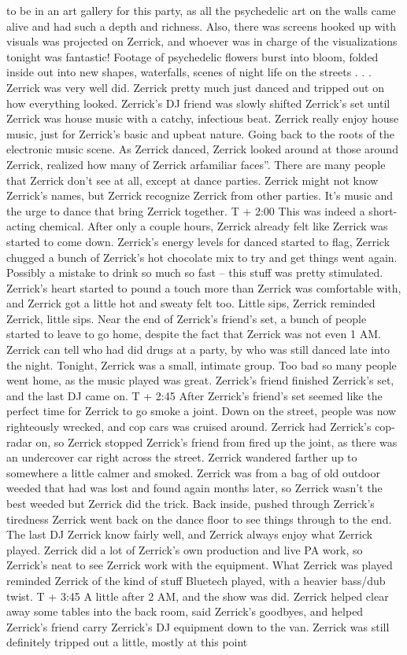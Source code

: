 \documentclass[12pt]{book}
\begin{document}
to be in an art gallery for this party, as all the psychedelic art on the walls came alive and had such a depth and richness. Also, there was screens hooked up with visuals was projected on Zerrick, and whoever was in charge of the visualizations tonight was fantastic! Footage of psychedelic flowers burst into bloom, folded inside out into new shapes, waterfalls, scenes of night life on the streets . . .  Zerrick was very well did. Zerrick pretty much just danced and tripped out on how everything looked. Zerrick's DJ friend was slowly shifted Zerrick's set until Zerrick was house music with a catchy, infectious beat. Zerrick really enjoy house music, just for Zerrick's basic and upbeat nature. Going back to the roots of the electronic music scene. As Zerrick danced, Zerrick looked around at those around Zerrick, realized how many of Zerrick arfamiliar faces''. There are many people that Zerrick don't see at all, except at dance parties. Zerrick might not know Zerrick's names, but Zerrick recognize Zerrick from other parties. It's music and the urge to dance that bring Zerrick together. T + 2:00 This was indeed a short-acting chemical. After only a couple hours, Zerrick already felt like Zerrick was started to come down. Zerrick's energy levels for danced started to flag, Zerrick chugged a bunch of Zerrick's hot chocolate mix to try and get things went again. Possibly a mistake to drink so much so fast -- this stuff was pretty stimulated. Zerrick's heart started to pound a touch more than Zerrick was comfortable with, and Zerrick got a little hot and sweaty felt too. Little sips, Zerrick reminded Zerrick, little sips. Near the end of Zerrick's friend's set, a bunch of people started to leave to go home, despite the fact that Zerrick was not even 1 AM. Zerrick can tell who had did drugs at a party, by who was still danced late into the night. Tonight, Zerrick was a small, intimate group. Too bad so many people went home, as the music played was great. Zerrick's friend finished Zerrick's set, and the last DJ came on. T + 2:45 After Zerrick's friend's set seemed like the perfect time for Zerrick to go smoke a joint. Down on the street, people was now righteously wrecked, and cop cars was cruised around. Zerrick had Zerrick's cop-radar on, so Zerrick stopped Zerrick's friend from fired up the joint, as there was an undercover car right across the street. Zerrick wandered farther up to somewhere a little calmer and smoked. Zerrick was from a bag of old outdoor weeded that had was lost and found again months later, so Zerrick wasn't the best weeded but Zerrick did the trick. Back inside, pushed through Zerrick's tiredness Zerrick went back on the dance floor to see things through to the end. The last DJ Zerrick know fairly well, and Zerrick always enjoy what Zerrick played. Zerrick did a lot of Zerrick's own production and live PA work, so Zerrick's neat to see Zerrick work with the equipment. What Zerrick was played reminded Zerrick of the kind of stuff Bluetech played, with a heavier bass/dub twist. T + 3:45 A little after 2 AM, and the show was did. Zerrick helped clear away some tables into the back room, said Zerrick's goodbyes, and helped Zerrick's friend carry Zerrick's DJ equipment down to the van. Zerrick was still definitely tripped out a little, mostly at this point 
\end{document}
